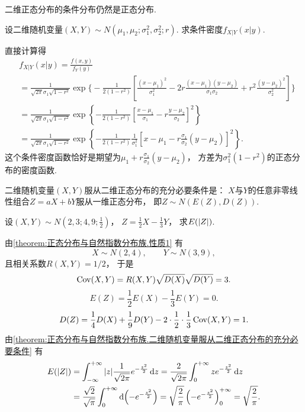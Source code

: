 二维正态分布的条件分布仍然是正态分布.
\begin{example}\label{theorem:正态分布与自然指数分布族.性质4}
设二维随机变量\((X,Y) \sim N(\mu_1,\mu_2;\sigma_1^2,\sigma_2^2;r)\).
求条件密度\(f_{X \vert Y}(x \vert y)\).
\begin{solution}
\def\A{\frac{1}{\sqrt{2\pi}\sigma_1\sqrt{1-r^2}}}%
\def\B{\frac{1}{2(1-r^2)}}%
直接计算得\begin{align*}
	&f_{X \vert Y}(x \vert y) = \frac{f(x,y)}{f_Y(y)} \\
	&= \A
		\exp\Biggl\{
			- \B
			\left[
				\frac{(x-\mu_1)^2}{\sigma_1^2}
				- 2r\frac{(x-\mu_1)(y-\mu_2)}{\sigma_1\sigma_2}
				+ r^2\frac{(y-\mu_2)^2}{\sigma_2^2}
			\right]
		\Biggr\} \\
	&= \A
		\exp\left\{
			- \B
			\left[
				\frac{x-\mu_1}{\sigma_1}
				- r\frac{y-\mu_2}{\sigma_2}
			\right]^2
		\right\} \\
	&= \A
		\exp\left\{
			- \B
			\frac{1}{\sigma_1^2}
			\left[
				x - \mu_1
				- r\frac{\sigma_1}{\sigma_2}(y-\mu_2)
			\right]^2
		\right\}.
\end{align*}
这个条件密度函数恰好是期望为\(\mu_1+r\frac{\sigma_1}{\sigma_2}(y-\mu_2)\)，
方差为\(\sigma_1^2(1-r^2)\)的正态分布的密度函数.
\end{solution}
\end{example}

\begin{theorem}\label{theorem:正态分布与自然指数分布族.二维随机变量服从二维正态分布的充分必要条件}
二维随机变量\((X,Y)\)服从二维正态分布的充分必要条件是：
\(X\)与\(Y\)的任意非零线性组合\(Z=aX+bY\)服从一维正态分布，
即\(Z \sim N(E(Z),D(Z))\).
\end{theorem}

\begin{example}
设\((X,Y) \sim N\left(2,3;4,9;\frac{1}{2}\right)\)，
\(Z = \frac{1}{2} X - \frac{1}{3} Y\)，
求\(E(\abs{Z})\).
\begin{solution}
由\cref{theorem:正态分布与自然指数分布族.性质1} 有\[
	X \sim N(2,4), \qquad
	Y \sim N(3,9),
\]且相关系数\(R(X,Y) = 1/2\)，
于是\[
	\operatorname{Cov}(X,Y) = R(X,Y) \sqrt{D(X)} \sqrt{D(Y)} = 3.
\]\[
	E(Z) = \frac{1}{2} E(X) - \frac{1}{3} E(Y) = 0.
\]\[
	D(Z) = \frac{1}{4} D(X) + \frac{1}{9} D(Y)
		- 2 \cdot \frac{1}{2} \cdot \frac{1}{3} \operatorname{Cov}(X,Y)
	= 1.
\]
由\cref{theorem:正态分布与自然指数分布族.二维随机变量服从二维正态分布的充分必要条件}
有\begin{align*}
	E(\abs{Z})
	&= \int_{-\infty}^{+\infty} \abs{z} \frac{1}{\sqrt{2\pi}} e^{-\frac{z^2}{2}} \dd{z}
	= \frac{2}{\sqrt{2\pi}} \int_0^{+\infty} z e^{-\frac{z^2}{2}} \dd{z} \\
	&= \frac{\sqrt{2}}{\sqrt{\pi}} \int_0^{+\infty} \dd(-e^{-\frac{z^2}{2}})
	= \sqrt{\frac{2}{\pi}} \left(-e^{-\frac{z^2}{2}}\right)_0^{+\infty}
	= \sqrt{\frac{2}{\pi}}.
\end{align*}
\end{solution}
\end{example}


